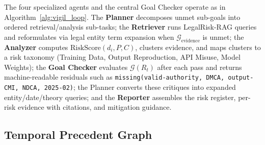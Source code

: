 The four specialized agents and the central Goal Checker operate as in Algorithm~\ref{alg:vigil_loop}. The \textbf{Planner} decomposes unmet sub-goals into ordered retrieval/analysis sub-tasks; the \textbf{Retriever} runs LegalRisk-RAG queries and reformulates via legal entity term expansion when $\mathcal{G}_{\text{evidence}}$ is unmet; the \textbf{Analyzer} computes $\text{RiskScore}(d_i, P, C)$, clusters evidence, and maps clusters to a risk taxonomy (Training Data, Output Reproduction, API Misuse, Model Weights); the \textbf{Goal Checker} evaluates $\mathcal{G}(R_t)$ after each pass and returns machine-readable residuals such as \texttt{missing(valid-authority, DMCA, output-CMI, NDCA, 2025-02)}; the Planner converts these critiques into expanded entity/date/theory queries; and the \textbf{Reporter} assembles the risk register, per-risk evidence with citations, and mitigation guidance.

\subsection{Temporal Precedent Graph}
\label{sec:tpg}

